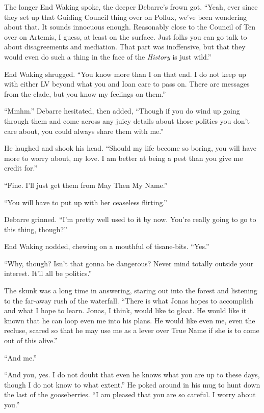 The longer End Waking spoke, the deeper Debarre's frown got. ``Yeah, ever since they set up that Guiding Council thing over on Pollux, we've been wondering about that. It sounds innocuous enough. Reasonably close to the Council of Ten over on Artemis, I guess, at least on the surface. Just folks you can go talk to about disagreements and mediation. That part was inoffensive, but that they would even do such a thing in the face of the \emph{History} is just wild.''

End Waking shrugged. ``You know more than I on that end. I do not keep up with either LV beyond what you and Ioan care to pass on. There are messages from the clade, but you know my feelings on them.''

``Mmhm.'' Debarre hesitated, then added, ``Though if you do wind up going through them and come across any juicy details about those politics you don't care about, you could always share them with me.''

He laughed and shook his head. ``Should my life become so boring, you will have more to worry about, my love. I am better at being a pest than you give me credit for.''

``Fine. I'll just get them from May Then My Name.''

``You will have to put up with her ceaseless flirting.''

Debarre grinned. ``I'm pretty well used to it by now. You're really going to go to this thing, though?''

End Waking nodded, chewing on a mouthful of tisane-bits. ``Yes.''

``Why, though? Isn't that gonna be dangerous? Never mind totally outside your interest. It'll all be politics.''

The skunk was a long time in answering, staring out into the forest and listening to the far-away rush of the waterfall. ``There is what Jonas hopes to accomplish and what I hope to learn. Jonas, I think, would like to gloat. He would like it known that he can loop even me into his plans. He would like even me, even the recluse, scared so that he may use me as a lever over True Name if she is to come out of this alive.''

``And me.''

``And you, yes. I do not doubt that even he knows what you are up to these days, though I do not know to what extent.'' He poked around in his mug to hunt down the last of the gooseberries. ``I am pleased that you are so careful. I worry about you.''

